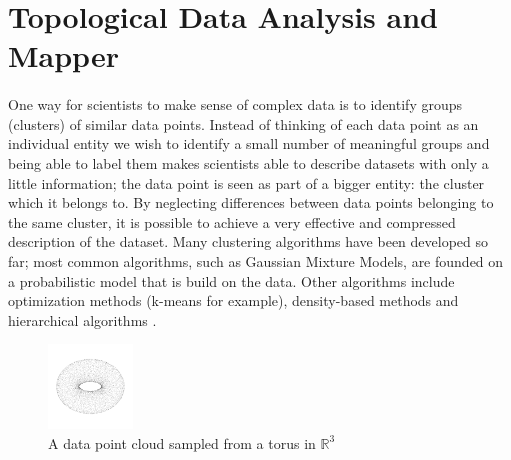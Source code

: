 


\setcounter{page}{1}
\ifpdf
\graphicspath{{Figs/}}
\else
\graphicspath{{Figs/}}
\fi


\section {Topological Data Analysis and Mapper} 

\paragraph{}
One way for scientists to make sense of complex data is to identify groups (clusters) of similar data points. Instead of thinking of each data point as an individual entity we wish to identify a small number of meaningful groups and being able to label them makes scientists able to describe datasets with only a little information; the data point is seen as part of a bigger entity: the cluster which it belongs to. By neglecting differences between data points belonging to the same cluster, it is possible to achieve a very effective and compressed description of the dataset. Many clustering algorithms have been developed so far; most common algorithms, such as Gaussian Mixture Models, are founded on a probabilistic model that is build on the data. Other algorithms include optimization methods (k-means for example), density-based methods and hierarchical algorithms \cite{handbook_of_cluster}.

\begin{figure}[htbp!] 
	\centering    
	\includegraphics[width=0.2\textwidth]{Point_cloud_torus.png}
	\caption{A data point cloud sampled from a torus in $\mathbb{R}^3$}
	\label{fig:torus}
\end{figure}

